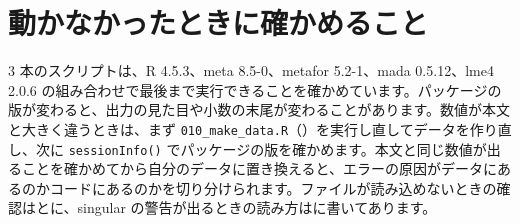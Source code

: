 
\section{動かなかったときに確かめること}
\label{sec:A-9}

3 本のスクリプトは、R 4.5.3、meta 8.5-0、metafor 5.2-1、mada 0.5.12、lme4 2.0.6 の組み合わせで最後まで実行できることを確かめています。パッケージの版が変わると、出力の見た目や小数の末尾が変わることがあります。数値が本文と大きく違うときは、まず \texttt{010\_make\_data.R}（）を実行し直してデータを作り直し、次に \texttt{sessionInfo()} でパッケージの版を確かめます。本文と同じ数値が出ることを確かめてから自分のデータに置き換えると、エラーの原因がデータにあるのかコードにあるのかを切り分けられます。ファイルが読み込めないときの確認はとに、singular の警告が出るときの読み方はに書いてあります。
